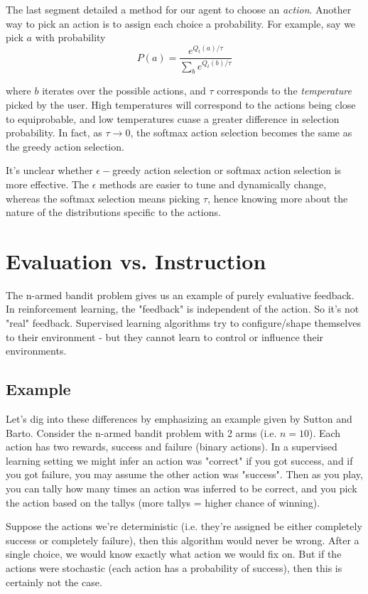 \documentclass[11pt]{article}
\theoremstyle{definition}
\begin{document}
The last segment detailed a method for our agent to choose an \textit{action}.  Another way to pick an action is to assign each choice a probability.  For example, say we pick $a$ with probability
\[
    P(a) = \frac{e^{Q_t(a) / \tau}}{\sum_b e^{Q_t(b) / \tau}}
\]

where $b$ iterates over the possible actions, and $\tau$ corresponds to the \textit{temperature} picked by the user.  High temperatures will correspond to the actions being close to equiprobable, and low temperatures cuase a greater difference in selection probability.  In fact, as $\tau\to0$, the softmax action selection becomes the same as the greedy action selection.

It's unclear whether $\epsilon-$greedy action selection or softmax action selection is more effective.  The $\epsilon$ methods are easier to tune and dynamically change, whereas the softmax selection means picking $\tau$, hence knowing more about the nature of the distributions specific to the actions.

\section*{\textcolor{CalPolyGreen}{Evaluation vs. Instruction}}

The n-armed bandit problem gives us an example of purely evaluative feedback. In reinforcement learning, the "feedback" is independent of the action. So it's not "real" feedback. Supervised learning algorithms try to configure/shape themselves to their environment - but they cannot learn to control or influence their environments.

\subsection*{\textcolor{CalPolyGreen}{Example}}

Let's dig into these differences by emphasizing an example given by Sutton and Barto. Consider the n-armed bandit problem with 2 arms (i.e. $n=10$). Each action has two rewards, success and failure (binary actions). In a supervised learning setting we might infer an action was "correct" if you got success, and if you got failure, you may assume the other action was "success". Then as you play, you can tally how many times an action was inferred to be correct, and you pick the action based on the tallys (more tallys = higher chance of winning).

Suppose the actions we're deterministic (i.e. they're assigned be either completely success or completely failure), then this algorithm would never be wrong. After a single choice, we would know exactly what action we would fix on. But if the actions were stochastic (each action has a probability of success), then this is certainly not the case.
\end{document}
